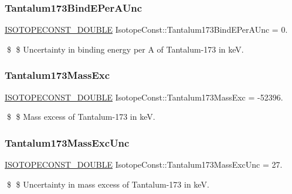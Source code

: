 \subsubsection{\texorpdfstring{Tantalum173\+Bind\+E\+Per\+A\+Unc}{Tantalum173BindEPerAUnc}}
{\footnotesize\ttfamily \mbox{\hyperlink{group___isotope_const-_macros_ga8f45a7272ce02c0b4c65c44636ed719a}{I\+S\+O\+T\+O\+P\+E\+C\+O\+N\+S\+T\+\_\+\+D\+O\+U\+B\+LE}} Isotope\+Const\+::\+Tantalum173\+Bind\+E\+Per\+A\+Unc = 0.}

\$ \$ Uncertainty in binding energy per A of Tantalum-\/173 in keV. \mbox{\label{group___isotope_const-_tantalum-_ta173_gadc0ddfd4d6fb5af8383484963bdb541d}} 
\subsubsection{\texorpdfstring{Tantalum173\+Mass\+Exc}{Tantalum173MassExc}}
{\footnotesize\ttfamily \mbox{\hyperlink{group___isotope_const-_macros_ga8f45a7272ce02c0b4c65c44636ed719a}{I\+S\+O\+T\+O\+P\+E\+C\+O\+N\+S\+T\+\_\+\+D\+O\+U\+B\+LE}} Isotope\+Const\+::\+Tantalum173\+Mass\+Exc = -\/52396.}

\$ \$ Mass excess of Tantalum-\/173 in keV. \mbox{\label{group___isotope_const-_tantalum-_ta173_ga4909cbb7de15cea5e8e45ecc95811c4c}} 
\subsubsection{\texorpdfstring{Tantalum173\+Mass\+Exc\+Unc}{Tantalum173MassExcUnc}}
{\footnotesize\ttfamily \mbox{\hyperlink{group___isotope_const-_macros_ga8f45a7272ce02c0b4c65c44636ed719a}{I\+S\+O\+T\+O\+P\+E\+C\+O\+N\+S\+T\+\_\+\+D\+O\+U\+B\+LE}} Isotope\+Const\+::\+Tantalum173\+Mass\+Exc\+Unc = 27.}

\$ \$ Uncertainty in mass excess of Tantalum-\/173 in keV. \mbox{\label{group___isotope_const-_tantalum-_ta173_gaa4a62566286a53bb97ee1d11086a78fb}} 
